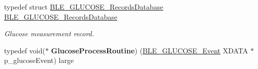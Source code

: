\begin{DoxyCompactItemize}
\item 
typedef struct \hyperlink{struct_b_l_e___g_l_u_c_o_s_e___records_database}{B\+L\+E\+\_\+\+G\+L\+U\+C\+O\+S\+E\+\_\+\+Records\+Database} \hyperlink{group___b_l_e___g_s_ga5689bcf43c1ef64defad972ad53649c9}{B\+L\+E\+\_\+\+G\+L\+U\+C\+O\+S\+E\+\_\+\+Records\+Database}\hypertarget{group___b_l_e___g_s_ga5689bcf43c1ef64defad972ad53649c9}{}\label{group___b_l_e___g_s_ga5689bcf43c1ef64defad972ad53649c9}

\begin{DoxyCompactList}\small\item\em Glucose measurement record. \end{DoxyCompactList}\item 
typedef void($\ast$ {\bfseries Glucose\+Process\+Routine}) (\hyperlink{struct_b_l_e___g_l_u_c_o_s_e___event}{B\+L\+E\+\_\+\+G\+L\+U\+C\+O\+S\+E\+\_\+\+Event} X\+D\+A\+TA $\ast$p\+\_\+glucose\+Event) large\hypertarget{group___b_l_e___g_s_ga20270fb7fa4e542ca45dc0f6331905c6}{}\label{group___b_l_e___g_s_ga20270fb7fa4e542ca45dc0f6331905c6}

\end{DoxyCompactItemize}
